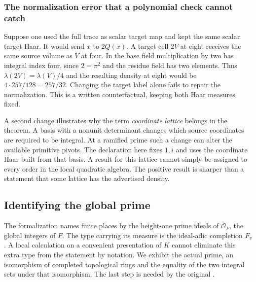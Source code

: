 \documentclass[12pt,letterpaper]{article}
\newcommand{\code}[1]{\texttt{\detokenize{#1}}}
\begin{document}
\subsubsection{The normalization error that a polynomial check cannot catch}
Suppose one used the full trace as scalar target map and kept the same scalar target Haar. It would send $x$ to $2Q(x)$. A target cell $2V$ at eight receives the same source volume as $V$ at four. In the base field multiplication by two has integral index four, since $2=\pi^2$ and the residue field has two elements. Thus $\lambda(2V)=\lambda(V)/4$ and the resulting density at eight would be $4\cdot257/128=257/32$. Changing the target label alone fails to repair the normalization. This is a written counterfactual, keeping both Haar measures fixed.
\par
A second change illustrates why the term \emph{coordinate lattice} belongs in the theorem. A basis with a nonunit determinant changes which source coordinates are required to be integral. At a ramified prime such a change can alter the available primitive pivots. The declaration here fixes $1,i$ and uses the coordinate Haar built from that basis. A result for this lattice cannot simply be assigned to every order in the local quadratic algebra. The positive result is sharper than a statement that some lattice has the advertised density.
\subsection{Identifying the global prime}
The formalization names finite places by the height-one prime ideals of $\mathcal O_F$, the global integers of $F$. The type carrying its measure is the ideal-adic completion $F_v$. A local calculation on a convenient presentation of $K$ cannot eliminate this extra type from the statement by notation. We exhibit the actual prime, an isomorphism of completed topological rings and the equality of the two integral sets under that isomorphism. The last step is needed by the original \code{latV}.
\end{document}
